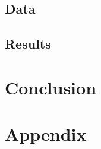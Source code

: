 \documentclass{thesis}
\begin{document}
\subsection{Data}
\subsection{Results}

\section{Conclusion}

\section{Appendix}

\newpage
\let\Section\section 
\def\section*#1{\Section{#1}}


\end{document}
